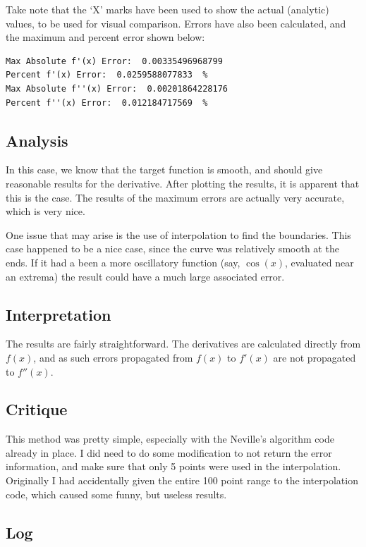\documentclass[10pt,letter]{article}
\begin{document}
Take note that the `X' marks have been used to show the actual (analytic) values, to be used for visual comparison. Errors have also been calculated, and the maximum and percent error shown below:

\begin{verbatim}
Max Absolute f'(x) Error:  0.00335496968799
Percent f'(x) Error:  0.0259588077833  %
Max Absolute f''(x) Error:  0.00201864228176
Percent f''(x) Error:  0.012184717569  %
\end{verbatim}

\subsection{Analysis}

In this case, we know that the target function is smooth, and should give reasonable results for the derivative. After plotting the results, it is apparent that this is the case. The results of the maximum errors are actually very accurate, which is very nice.

One issue that may arise is the use of interpolation to find the boundaries. This case happened to be a nice case, since the curve was relatively smooth at the ends. If it had a been a more oscillatory function (say, $\cos(x)$, evaluated near an extrema) the result could have a much large associated error.

\subsection{Interpretation}

The results are fairly straightforward. The derivatives are calculated directly from $f(x)$, and as such errors propagated from $f(x)$ to $f'(x)$ are not propagated to $f''(x)$.

\subsection{Critique}

This method was pretty simple, especially with the Neville's algorithm code already in place. I did need to do some modification to not return the error information, and make sure that only 5 points were used in the interpolation. Originally I had accidentally given the entire 100 point range to the interpolation code, which caused some funny, but useless results.

\subsection{Log}
\end{document}
